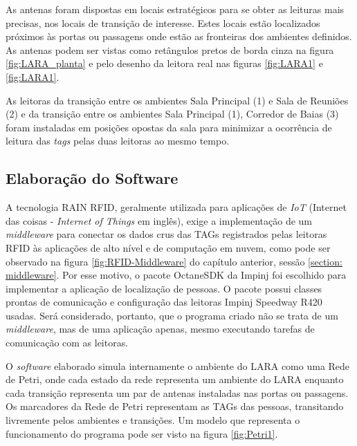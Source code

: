As antenas foram dispostas em locais estratégicos para se obter as leituras mais precisas, nos locais de transição de interesse. Estes locais estão localizados próximos às portas ou passagens onde estão as fronteiras dos ambientes definidos. As antenas podem ser vistas como retângulos pretos de borda cinza na figura \ref{fig:LARA_planta} e pelo desenho da leitora real nas figuras \ref{fig:LARA1} e \ref{fig:LARA1}.

As leitoras da transição entre os ambientes Sala Principal (1) e Sala de Reuniões (2) e da transição entre os ambientes Sala Principal (1), Corredor de Baias (3) foram instaladas em posições opostas da sala para minimizar a ocorrência de leitura das \textit{tags} pelas duas leitoras ao mesmo tempo.

 \subsection{Elaboração do Software} \label{section:software}
 
 A tecnologia RAIN RFID, geralmente utilizada para aplicações de \textit{IoT} (Internet das coisas - \textit{Internet of Things} em inglês), exige a implementação de um \textit{middleware} para conectar os dados crus das TAGs registrados pelas leitoras RFID às aplicações de alto nível e de computação em nuvem, como pode ser observado na figura \ref{fig:RFID-Middleware} do capítulo anterior, sessão \ref{section: middleware}. Por esse motivo, o pacote OctaneSDK da Impinj foi escolhido para implementar a aplicação de localização de pessoas. O pacote possui classes prontas de comunicação e configuração das leitoras Impinj Speedway R420 usadas. Será considerado, portanto, que o programa criado não se trata de um \textit{middleware}, mas de uma aplicação apenas, mesmo executando tarefas de comunicação com as leitoras.
 
 O \textit{software} elaborado simula internamente o ambiente do LARA como uma Rede de Petri, onde cada estado da rede representa um ambiente do LARA enquanto cada transição representa um par de antenas instaladas nas portas ou passagens. Os marcadores da Rede de Petri representam as TAGs das pessoas, transitando livremente pelos ambientes e transições. Um modelo que representa o funcionamento do programa pode ser visto na figura \ref{fig:Petri1}.
 
